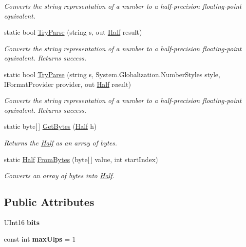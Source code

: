 \begin{DoxyCompactItemize}
\begin{DoxyCompactList}\small\item\em Converts the string representation of a number to a half-\/precision floating-\/point equivalent.\end{DoxyCompactList}\item 
static bool \hyperlink{struct_open_t_k_1_1_half_a3602fb09ee286dfb240ac561ecbc5296}{Try\-Parse} (string s, out \hyperlink{struct_open_t_k_1_1_half}{Half} result)
\begin{DoxyCompactList}\small\item\em Converts the string representation of a number to a half-\/precision floating-\/point equivalent. Returns success.\end{DoxyCompactList}\item 
static bool \hyperlink{struct_open_t_k_1_1_half_a0d3c83a6d7571e6b0ca124b4d7a2b766}{Try\-Parse} (string s, System.\-Globalization.\-Number\-Styles style, I\-Format\-Provider provider, out \hyperlink{struct_open_t_k_1_1_half}{Half} result)
\begin{DoxyCompactList}\small\item\em Converts the string representation of a number to a half-\/precision floating-\/point equivalent. Returns success.\end{DoxyCompactList}\item 
static byte\mbox{[}$\,$\mbox{]} \hyperlink{struct_open_t_k_1_1_half_a3468a68a355d4134b65401debecc56fe}{Get\-Bytes} (\hyperlink{struct_open_t_k_1_1_half}{Half} h)
\begin{DoxyCompactList}\small\item\em Returns the \hyperlink{struct_open_t_k_1_1_half}{Half} as an array of bytes.\end{DoxyCompactList}\item 
static \hyperlink{struct_open_t_k_1_1_half}{Half} \hyperlink{struct_open_t_k_1_1_half_a27d9efd7c019881959288cece98c8395}{From\-Bytes} (byte\mbox{[}$\,$\mbox{]} value, int start\-Index)
\begin{DoxyCompactList}\small\item\em Converts an array of bytes into \hyperlink{struct_open_t_k_1_1_half}{Half}.\end{DoxyCompactList}\end{DoxyCompactItemize}
\subsection*{Public Attributes}
\begin{DoxyCompactItemize}
\item 
\hypertarget{struct_open_t_k_1_1_half_a76e1575f9d67ee2f72597f62e3f1bbab}{U\-Int16 {\bfseries bits}}\label{struct_open_t_k_1_1_half_a76e1575f9d67ee2f72597f62e3f1bbab}

\item 
\hypertarget{struct_open_t_k_1_1_half_a8ffd6b056f319f537d7aceed4ecebf4f}{const int {\bfseries max\-Ulps} = 1}\label{struct_open_t_k_1_1_half_a8ffd6b056f319f537d7aceed4ecebf4f}

\end{DoxyCompactItemize}
